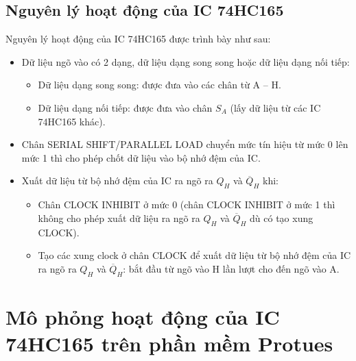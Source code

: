 \documentclass[12pt,a4paper]{article}
\begin{document}
\subsection{Nguyên lý hoạt động của IC 74HC165}
    Nguyên lý hoạt động của IC 74HC165 được trình bày như sau:
    \begin{itemize}
        \item Dữ liệu ngõ vào có 2 dạng, dữ liệu dạng song song hoặc dữ liệu dạng nối tiếp:
            \begin{itemize}
                \item Dữ liệu dạng song song: được đưa vào các chân từ A -- H.
                \item Dữ liệu dạng nối tiếp: được đưa vào chân $S_A$ (lấy dữ liệu từ các IC 74HC165 khác).
            \end{itemize}
        \item Chân SERIAL SHIFT/PARALLEL LOAD chuyển mức tín hiệu từ mức 0 lên mức 1 thì cho phép chốt dữ liệu vào bộ nhớ đệm của IC.
        \item Xuất dữ liệu từ bộ nhớ đệm của IC ra ngõ ra $Q_H$ và $\overline{Q}_H$ khi:
            \begin{itemize}
                \item Chân CLOCK INHIBIT ở mức 0 (chân CLOCK INHIBIT ở mức 1 thì không cho phép xuất dữ liệu ra ngõ ra $Q_H$ và $\overline{Q}_H$ dù có tạo xung CLOCK).
                \item Tạo các xung clock ở chân CLOCK để xuất dữ liệu từ bộ nhớ đệm của IC ra ngõ ra $Q_H$ và $\overline{Q}_H$: bắt đầu từ ngõ vào H lần lượt cho đến ngõ vào A.
            \end{itemize}
    \end{itemize}

\section{Mô phỏng hoạt động của IC 74HC165 trên phần mềm Protues}
\end{document}
